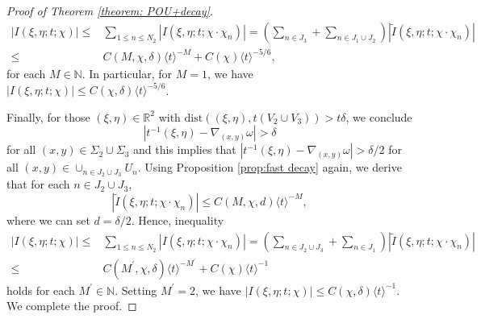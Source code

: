 \documentclass[10pt,a4paper]{amsart}
\newcommand\JP[1]{\langle#1\rangle}
\newcommand{\R}{\mathbb{R}}
\begin{document}
\begin{proof}[Proof of Theorem \ref{theorem: POU+decay}]
\begin{equation*}
        \begin{aligned}
            \left|I\left(\xi,\eta;t;\chi\right)\right|\leq&\sum_{1\leq n\leq N_{2}}\left|I\left(\xi,\eta;t;\chi\cdot\chi_{n}\right)\right|=\left(\sum_{n\in J_{3}}+\sum_{n\in J_{1}\cup J_{2}}\right)\left|\widetilde{I}\left(\xi,\eta;t;\chi\cdot\chi_{n}\right)\right|\\
            \leq&C\left(M,\chi,\delta\right)\JP{t}^{-M}+C\left(\chi\right)\JP{t}^{-5/6},
        \end{aligned}
    \end{equation*}
    for each $M\in\mathbb{N}$. In particular, for $M=1$, we have $\left|I\left(\xi,\eta;t;\chi\right)\right|\leq C\left(\chi,\delta\right)\JP{t}^{-5/6}$. 

    Finally, for those $\left(\xi,\eta\right)\in \R^{2}$ with $\mathrm{dist}\left(\left(\xi,\eta\right),t\left(V_{2}\cup V_{3}\right)\right)>t\delta$, we conclude
    \begin{equation*}
        \left|t^{-1}\left(\xi,\eta\right)-\nabla_{\left(x,y\right)}\omega\right|>\delta
    \end{equation*}
    for all $\left(x,y\right)\in \Sigma_{2}\cup \Sigma_{3}$ and this implies that $\left|t^{-1}\left(\xi,\eta\right)-\nabla_{\left(x,y\right)}\omega\right|>\delta/2$ for all $\left(x,y\right)\in\cup_{n\in J_{2}\cup J_{3}}U_{n}$. Using Proposition \ref{prop:fast decay} again, we derive that for each $n\in J_{2}\cup J_{3}$, 
    \begin{equation*}
        \left|\widetilde{I}\left(\xi,\eta;t;\chi\cdot\chi_{n}\right)\right|\leq C\left(M,\chi,d\right)\JP{t}^{-M},
    \end{equation*}
    where we can set $d=\delta/2$. Hence, inequality
    \begin{equation*}
        \begin{aligned}
            \left|I\left(\xi,\eta;t;\chi\right)\right|\leq&\sum_{1\leq n\leq N_{2}}\left|I\left(\xi,\eta;t;\chi\cdot\chi_{n}\right)\right|=\left(\sum_{n\in J_{2}\cup J_{3}}+\sum_{n\in J_{1}}\right)\left|\widetilde{I}\left(\xi,\eta;t;\chi\cdot\chi_{n}\right)\right|\\
            \leq&C\left(M^{\prime},\chi,\delta\right)\JP{t}^{-M^{\prime}}+C\left(\chi\right)\JP{t}^{-1}
        \end{aligned}
    \end{equation*}
    holds for each $M^{\prime}\in\mathbb{N}$. Setting $M^{\prime}=2$, we have $\left|I\left(\xi,\eta;t;\chi\right)\right|\leq C\left(\chi,\delta\right)\JP{t}^{-1}$. We complete the proof.
\end{proof}
\end{document}
